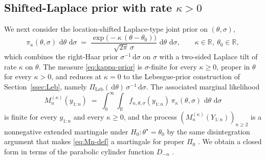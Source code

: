 \documentclass{article}%
\newcommand{\R}{\mathbb{R}}
\newcommand{\dd}{\,\mathrm{d}}
\newcommand{\Leb}{\mathrm{Leb}}
\begin{document}
\subsection{Shifted-Laplace prior with rate \(\kappa>0\)}\label{ssec:kappa}


We next consider the location-shifted Laplace-type joint prior on
\((\theta,\sigma)\),
\begin{equation}\label{eq:kappa-prior}
   \pi_\kappa(\theta,\sigma)\,\dd\theta\,\dd\sigma
   \;=\;\frac{\exp\!\bigl(-\kappa\,(\theta-\theta_0)\bigr)}
            {\sqrt{2\pi}\,\sigma}\,\dd\theta\,\dd\sigma,
   \qquad \kappa \in \mathbb{R},\ \theta_0\in\R,
\end{equation}
which combines the right-Haar prior \(\sigma^{-1}\dd\sigma\) on
\(\sigma\) with a two-sided Laplace tilt of rate \(\kappa\) on
\(\theta\). The measure \eqref{eq:kappa-prior} is \(\sigma\)-finite for
every \(\kappa\geq 0\), proper in \(\theta\) for every
\(\kappa>0\), and reduces at \(\kappa=0\) to the Lebesgue-prior
construction of Section~\ref{ssec:Leb}, namely
\(\Pi_{\Leb}(\dd\theta)\,\sigma^{-1}\dd\sigma\). The associated
marginal likelihood
\begin{equation}\label{eq:Mn-kappa-def}
  M_n^{(\kappa)}(y_{1:n})
  \;=\;\int_0^\infty\!\!\int_\R f_{n,\theta,\sigma}(y_{1:n})
        \,\pi_\kappa(\theta,\sigma)\,\dd\theta\,\dd\sigma
\end{equation}
is finite for every \(y_{1:n}\) and every \(\kappa\geq 0\), and the
process \((M_n^{(\kappa)}(Y_{1:n}))_{n\geq 2}\) is a nonnegative
extended martingale under \(H_0:\theta^\star=\theta_0\) by the same
disintegration argument that makes \eqref{eq:Mn-def} a martingale for
proper \(\Pi_0\) \cite[Lemma~5.4]{Wang2025}. We obtain a closed form
in terms of the parabolic cylinder function \(D_{-n}\)
\citep{GradshteynRyzhik2014}.
\end{document}
